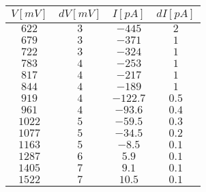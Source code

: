 \begin{tabular}{cccc}
\hline
	$V[mV]$ & $dV[mV]$ & $I[pA]$ & $dI[pA]$\\ 
\hline
	$622$ & $3$ & $-445$ & $2$ \\
	$679$ & $3$ & $-371$ & $1$ \\
	$722$ & $3$ & $-324$ & $1$ \\
	$783$ & $4$ & $-253$ & $1$ \\
	$817$ & $4$ & $-217$ & $1$ \\
	$844$ & $4$ & $-189$ & $1$ \\
	$919$ & $4$ & $-122.7$ & $0.5$ \\
	$961$ & $4$ & $-93.6$ & $0.4$ \\
	$1022$ & $5$ & $-59.5$ & $0.3$ \\
	$1077$ & $5$ & $-34.5$ & $0.2$ \\
	$1163$ & $5$ & $-8.5$ & $0.1$ \\
	$1287$ & $6$ & $5.9$ & $0.1$ \\
	$1405$ & $7$ & $9.1$ & $0.1$ \\
	$1522$ & $7$ & $10.5$ & $0.1$ \\
\hline
\end{tabular}
